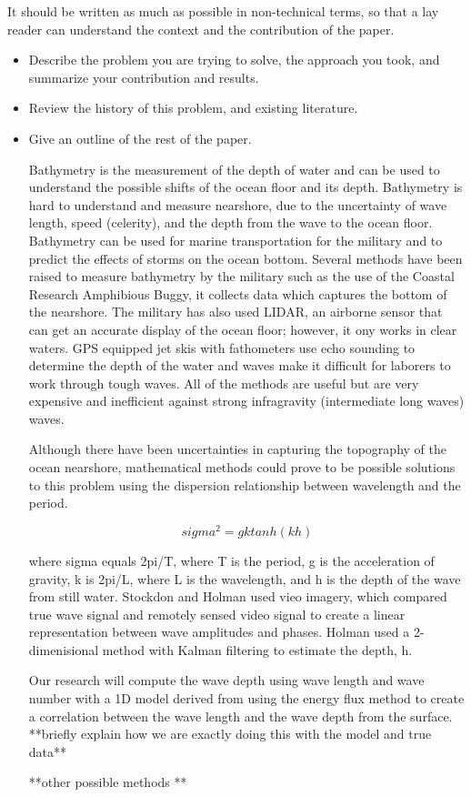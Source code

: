 It should be written as much as possible in non-technical terms, so that a
lay reader can understand the context and the contribution of the paper.

\begin{itemize}

\item Describe the problem you are trying to solve, the approach
you took, and summarize your contribution and results.

\item Review the history of this problem, and existing literature.

\item Give an outline of the rest of the paper.

Bathymetry is the measurement of the depth of water and can be used to understand the possible shifts of the ocean floor and its depth. Bathymetry is hard to understand and measure nearshore, due to the uncertainty of wave length, speed (celerity), and the depth from the wave to the ocean floor. Bathymetry can be used for marine transportation for the military and to predict the effects of storms on the ocean bottom. Several methods have been raised to measure bathymetry by the military such as the use of the Coastal Research Amphibious Buggy, it collects data which captures the bottom of the nearshore. The military has also used LIDAR, an airborne sensor that can get an accurate display of the ocean floor; however, it ony works in clear waters. GPS equipped jet skis with fathometers use echo sounding to determine the depth of the water and waves make it difficult for laborers to work through tough waves. All of the methods are useful but are very expensive and inefficient against strong infragravity (intermediate long waves) waves. 


Although there have been uncertainties in capturing the topography of the ocean nearshore, mathematical methods could prove to be possible solutions to this problem using the dispersion relationship between wavelength and the period.

 $$sigma^2=gktanh(kh)$$

where sigma equals 2pi/T, where T is the period, g is the acceleration of gravity, k is 2pi/L, where L is the wavelength, and h is the depth of the wave from still water. Stockdon and Holman used vieo imagery, which compared true wave signal and remotely sensed video signal to create a linear representation between wave amplitudes and phases. Holman used a 2-dimenisional method with Kalman filtering to estimate the depth, h.

Our research will compute the wave depth using wave length and wave number with a 1D model derived from using the energy flux method to create a correlation between the wave length and the wave depth from the surface. **briefly explain how we are exactly doing this with the model and true data**

**other possible methods **





\end{itemize}